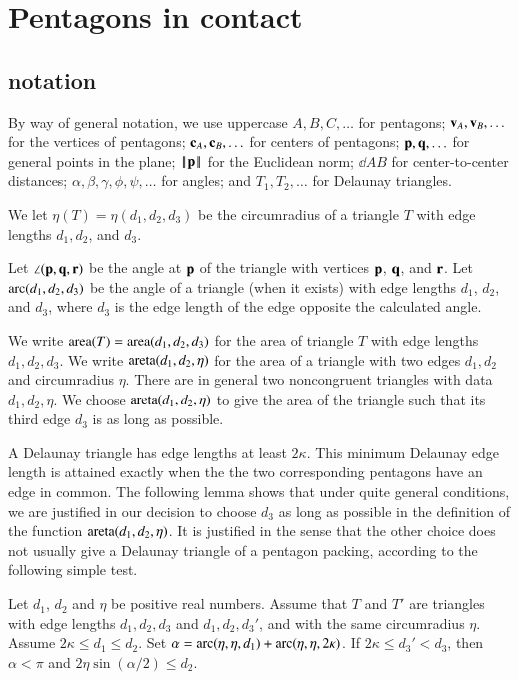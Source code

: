 \section{Pentagons in contact}


\subsection{notation}

By way of general notation, we use uppercase $A,B,C,\ldots$ for
pentagons; ${\mathbf v}_A,{\mathbf v}_B,\ldots$ for the vertices of pentagons;
${\mathbf c}_A,{\mathbf c}_B,\ldots$ for centers of pentagons; ${\mathbf p},{\mathbf q},\ldots$ for
general points in the plane; ${\hbox{\ensuremath{\hspace{0.1em}|\hspace{-0.1em}|\hspace{0.1em}}}{\mathbf p}\hbox{\ensuremath{\hspace{0.1em}|\hspace{-0.1em}|\hspace{0.1em}}}}$ for the Euclidean norm;
$\dd{A}{B}$ for center-to-center distances;
$\alpha,\beta,\gamma,\phi,\psi,\ldots$ for angles; and $T_1,T_2,\ldots$
for Delaunay triangles.

We let $\eta(T) = \eta(d_1,d_2,d_3)$ be the circumradius of a triangle
$T$ with edge lengths $d_1,d_2$, and $d_3$.

Let $\angle({\mathbf p},{\mathbf q},{\mathbf r})$ be the angle at ${\mathbf p}$ of the triangle with
vertices ${\mathbf p}$, ${\mathbf q}$, and ${\mathbf r}$.  Let $\operatorname{arc}(d_1,d_2,d_3)$ be the angle
of a triangle (when it exists) with edge lengths $d_1$, $d_2$, and
$d_3$, where $d_3$ is the edge length of the edge opposite the
calculated angle.




We write ${\operatorname{area}}(T)= {\operatorname{area}}(d_1,d_2,d_3)$ for the area of triangle $T$
with edge lengths $d_1,d_2,d_3$.  We write
${\operatorname{areta}}(d_1,d_2,\eta)$ for the area of a triangle with two edges
$d_1,d_2$ and circumradius $\eta$.  There are in general two
noncongruent triangles with data $d_1,d_2,\eta$.  We choose
${\operatorname{areta}}(d_1,d_2,\eta)$ to give the area of the triangle such that its
third edge $d_3$ is as long as possible.

A Delaunay triangle has edge lengths at least $2\kappa$.  This minimum
Delaunay edge length is attained exactly when the the two
corresponding pentagons have an edge in common.  The following lemma
shows that under quite general conditions, we are justified in our
decision to choose $d_3$ as long as possible in the definition of the
function ${\operatorname{areta}}(d_1,d_2,\eta)$.  It is justified in the sense that
the other choice does not usually give a Delaunay triangle of a pentagon
packing, according to the following simple test.

\begin{lemma}\label{lemma:areta}  Let $d_1$, $d_2$
and  $\eta$ be positive real numbers.
Assume that $T$ and $T'$ are triangles with edge lengths
$d_1,d_2,d_3$ and $d_1,d_2,d_3'$,  and with the same circumradius
$\eta$. Assume $2\kappa\le d_1\le d_2$.  Set
 $\alpha = \operatorname{arc}(\eta,\eta,d_1)+\operatorname{arc}(\eta,\eta,2\kappa)$.
If $2\kappa \le d_3' < d_3$, then $\alpha < \pi$ and $2\eta\sin(\alpha/2) \le d_2$.
\end{lemma}


